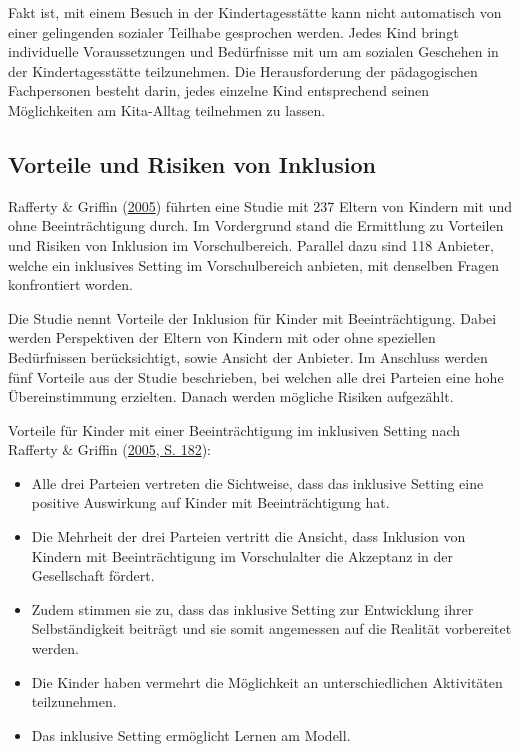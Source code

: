 \documentclass[
  ngerman,
  11pt,
  paper=a4,
  twoside,
  titlepage=true,
  openright,
  abstract=on,
  toc=listofnumbered,
  numbers=noenddot,
  chapterprefix=true,
  headings=optiontohead,
  svgnames,
  dvipsnames]{scrreprt}
\providecommand{\tightlist}{%
  \setlength{\itemsep}{0pt}\setlength{\parskip}{0pt}}
\begin{document}
Fakt ist, mit einem Besuch in der Kindertagesstätte kann nicht
automatisch von einer gelingenden sozialer Teilhabe gesprochen werden.
Jedes Kind bringt individuelle Voraussetzungen und Bedürfnisse mit um am
sozialen Geschehen in der Kindertagesstätte teilzunehmen. Die
Herausforderung der pädagogischen Fachpersonen besteht darin, jedes
einzelne Kind entsprechend seinen Möglichkeiten am Kita-Alltag
teilnehmen zu lassen.

\hypertarget{sec:forschungsgrundlageInklusion}{%
\subsection{Vorteile und Risiken von
Inklusion}\label{sec:forschungsgrundlageInklusion}}

Rafferty \& Griffin
(\protect\hyperlink{ref-raffertyux5cux26Griffin2005}{2005}) führten eine
Studie mit 237 Eltern von Kindern mit und ohne Beeinträchtigung durch.
Im Vordergrund stand die Ermittlung zu Vorteilen und Risiken von
Inklusion im Vorschulbereich. Parallel dazu sind 118 Anbieter, welche
ein inklusives Setting im Vorschulbereich anbieten, mit denselben Fragen
konfrontiert worden.

Die Studie nennt Vorteile der Inklusion für Kinder mit Beeinträchtigung.
Dabei werden Perspektiven der Eltern von Kindern mit oder ohne
speziellen Bedürfnissen berücksichtigt, sowie Ansicht der Anbieter. Im
Anschluss werden fünf Vorteile aus der Studie beschrieben, bei welchen
alle drei Parteien eine hohe Übereinstimmung erzielten. Danach werden
mögliche Risiken aufgezählt.

Vorteile für Kinder mit einer Beeinträchtigung im inklusiven Setting
nach Rafferty \& Griffin
(\protect\hyperlink{ref-raffertyux5cux26Griffin2005}{2005, S. 182}):

\begin{itemize}
\tightlist
\item
  Alle drei Parteien vertreten die Sichtweise, dass das inklusive
  Setting eine positive Auswirkung auf Kinder mit Beeinträchtigung hat.
\item
  Die Mehrheit der drei Parteien vertritt die Ansicht, dass Inklusion
  von Kindern mit Beeinträchtigung im Vorschulalter die Akzeptanz in der
  Gesellschaft fördert.
\item
  Zudem stimmen sie zu, dass das inklusive Setting zur Entwicklung ihrer
  Selbständigkeit beiträgt und sie somit angemessen auf die Realität
  vorbereitet werden.
\item
  Die Kinder haben vermehrt die Möglichkeit an unterschiedlichen
  Aktivitäten teilzunehmen.
\item
  Das inklusive Setting ermöglicht Lernen am Modell.
\end{itemize}
\end{document}
